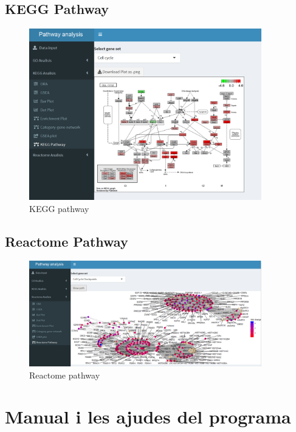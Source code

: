 \subsection{KEGG Pathway}


\begin{figure}[H]
\centering
\includegraphics[width=0.9\textwidth]{figures/App_F20_Items_KEGG_KEGGPathway.png} 
\caption{KEGG pathway}
\end{figure}

\subsection{Reactome Pathway}

\begin{figure}[H]
\centering
\includegraphics[width=0.9\textwidth]{figures/App_F21_Items_RA_RAPathway.png} 
\caption{Reactome pathway}
\end{figure}


\section{Manual i les ajudes del programa}

